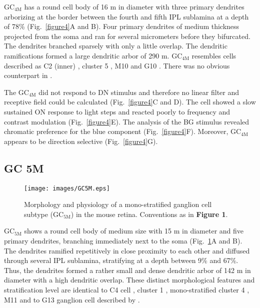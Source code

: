 GC$_{\text{4M}}$ has a round cell body of 16 \textmu m in diameter with three primary dendrites arborizing at the border between the fourth and fifth IPL sublamina at a depth of 78\% (Fig.~\ref{figure4}A and B). Four primary dendrites of medium thickness projected from the soma and ran for several micrometers before they bifurcated. The dendrites branched sparsely with only a little overlap. The dendritic ramifications formed a large dendritic arbor of 290 \textmu m. GC$_{\text{4M}}$ resembles cells described as C2 (inner) \citep{sun02}, cluster 5 \citep{kong05}, M10 \citep{coombs06} and G10 \citep{voelgyi09}. There was no obvious counterpart in \citet{badea04}.  

The GC$_{\text{4M}}$ did not respond to DN stimulus and therefore no linear filter and receptive field could be calculated (Fig.~\ref{figure4}C and D). The cell showed a slow sustained ON response to light steps and reacted poorly to frequency and contrast modulation (Fig.~\ref{figure4}E). The analysis of the 
BG stimulus revealed chromatic preference for the blue component (Fig.~\ref{figure4}F). Moreover, GC$_{\text{4M}}$ appears to be direction selective (Fig.~\ref{figure4}G). 


\subsection{GC 5M}     

\begin{figure}[t]
\begin{center}
\texttt{[image: images/GC5M.eps]}
\caption{Morphology and physiology of a mono-stratified ganglion cell subtype (GC$_\text{{5M}}$) in the mouse retina. Conventions as in \textbf{Figure 1}.}
\label{figure5}
\end{center}
\end{figure}

GC$_{\text{5M}}$ shows a round cell body of medium size with 15 \textmu m in diameter and five primary dendrites, branching immediately next to the soma (Fig.~\ref{figure5}A and B). The dendrites ramified repetitively in close proximity to each other and diffused through several IPL sublamina, stratifying at a depth between 9\% and 67\%. Thus, the dendrites formed a rather small and dense dendritic arbor of 142 \textmu m in diameter with a high dendritic overlap. These distinct morphological features and stratification level are identical to C4 cell \citep{sun02}, cluster 1 \citep{kong05}, mono-stratified cluster 4 \citep{badea04}, M11 \citep{coombs06} and to G13 ganglion cell described by \citet{voelgyi09}. 


